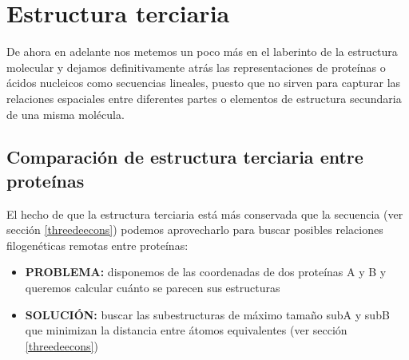 \chapter{Estructura terciaria} \label{s3}

De ahora en adelante nos metemos un poco m\'{a}s en el laberinto de la estructura molecular y dejamos definitivamente atr\'{a}s las representaciones de prote\'{i}nas o \'{a}cidos nucleicos como secuencias lineales, puesto que no sirven para capturar las relaciones espaciales entre diferentes partes o elementos de estructura secundaria de una misma mol\'{e}cula.


\section{Comparaci\'{o}n de estructura terciaria entre prote\'{i}nas} \label{compS3}

El hecho de que la estructura terciaria est\'{a} m\'{a}s conservada que la secuencia (ver secci\'{o}n \ref{threedeecons})
podemos aprovecharlo para buscar posibles relaciones filogen\'{e}ticas remotas entre prote\'{i}nas:

\begin{itemize}
\item \textbf{PROBLEMA:} disponemos de las coordenadas de dos prote\'{i}nas A y B y queremos calcular cu\'{a}nto se parecen sus estructuras
\item \textbf{SOLUCI\'{O}N:} buscar las subestructuras de m\'{a}ximo tama\~no subA y subB que minimizan la distancia entre \'{a}tomos equivalentes 
(ver secci\'{o}n \ref{threedeecons})
\end{itemize}

